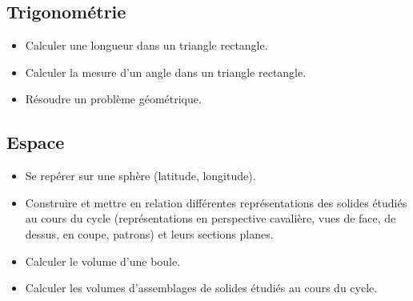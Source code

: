 \documentclass[a4paper,12pt,fleqn]{article}
\begin{document}
\subsection*{Trigonométrie}

\begin{itemize}
	\item {}Calculer une longueur dans un triangle rectangle.
	\item {}Calculer la mesure d'un angle dans un triangle rectangle.
	\item {}Résoudre un problème géométrique.
\end{itemize}

\subsection*{Espace}

\begin{itemize}
	\item {}Se repérer sur une sphère (latitude, longitude).
	\item {}Construire et mettre en relation différentes représentations des solides étudiés au cours du cycle (représentations en perspective cavalière, vues de face, de dessus, en coupe, patrons) et leurs sections planes.
	\item {}Calculer le volume d’une boule.
	\item {}Calculer les volumes d’assemblages de solides étudiés au cours du cycle.
\end{itemize}
\end{document}
